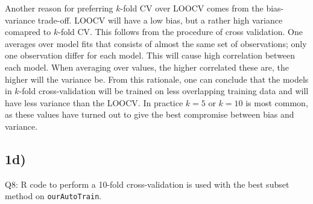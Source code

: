 \documentclass[]{article}
\begin{document}
Another reason for preferring \(k\)-fold CV over LOOCV comes from the
bias-variance trade-off. LOOCV will have a low bias, but a rather high
variance comapred to \(k\)-fold CV. This follows from the procedure of
cross validation. One averages over model fits that consists of almost
the same set of observations; only one observation differ for each
model. This will cause high correlation between each model. When
averaging over values, the higher correlated these are, the higher will
the variance be. From this rationale, one can conclude that the models
in \(k\)-fold cross-validation will be trained on less overlapping
training data and will have less variance than the LOOCV. In practice
\(k=5\) or \(k=10\) is most common, as these values have turned out to
give the best compromise between bias and variance.

\subsection{1d)}\label{d}

Q8: R code to perform a 10-fold cross-validation is used with the best
subset method on \texttt{ourAutoTrain}.
\end{document}

